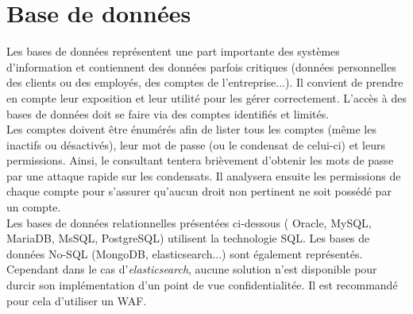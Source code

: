 \documentclass[twoside,a4paper,12pt,titlepage]{book}
\begin{document}
\section{Base de données}
	Les bases de données représentent une part importante des systèmes d'information et contiennent des données parfois critiques (données personnelles des clients ou des employés, des comptes de l'entreprise...). Il convient de prendre en compte leur exposition et leur utilité pour les gérer correctement. L'accès à des bases de données doit se faire via des comptes identifiés et limités.\\
	Les comptes doivent être énumérés afin de lister tous les comptes (même les inactifs ou désactivés), leur mot de passe (ou le condensat de celui-ci) et leurs permissions. Ainsi, le consultant tentera brièvement d'obtenir les mots de passe par une attaque rapide sur les condensats. Il analysera ensuite les permissions de chaque compte pour s'assurer qu'aucun droit non pertinent ne soit possédé par un compte.\\
	Les bases de données relationnelles présentées ci-dessous ( Oracle, MySQL, MariaDB, MsSQL, PostgreSQL) utilisent la technologie \gls{SQL}. Les bases de données No-SQL (MongoDB, elasticsearch...) sont également représentés. Cependant dans le cas d'\textit{elasticsearch}, aucune solution n'est disponible pour durcir son implémentation d'un point de vue confidentialitée. Il est recommandé pour cela d'utiliser un \gls{WAF}. 
\end{document}
